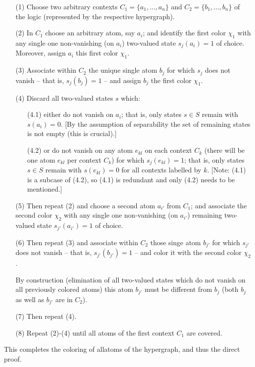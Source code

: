 \documentclass[%
  reprint,
  twocolumn,
 showpacs,
 showkeys,
 preprintnumbers,
 amsmath,amssymb,
 aps,
 pra,
  longbibliography,
 ]{revtex4-1}
\begin{document}
\begin{enumerate}
\item[(1)] Choose two arbitrary contexts
$C_1 =\{a_1,\ldots ,a_n\}$ and $C_2=\{b_1,\ldots ,b_n\}$ of the logic (represented by the respective hypergraph).

\item[(2)]
In $C_1$ choose an arbitrary atom, say $a_i$; and identify the first color $\chi_1$
with any single one non-vanishing (on $a_i$) two-valued state $s_j(a_i) =1$ of choice.
Moreover, assign $a_i$  this first color $\chi_1$.

\item[(3)] Associate within $C_2$ the unique single atom $b_j$ for which $s_j$ does not vanish
-- that is, $s_j(b_j)=1$ -- and assign $b_j$  the first color $\chi_1$.

\item[(4)] Discard all two-valued states $s$ which:

\begin{enumerate}
\item[(4.1)] either do not vanish on $a_i$; that is, only states $s \in S$ remain with $s(a_i)=0$.
[By the assumption of separability the set of remaining states is not empty (this is crucial).]

\item[(4.2)] or do not vanish on any atom $e_{kl}$ on each context $C_k$ (there will be one atom $e_{kl}$ per context $C_k$)
for which $s_j(e_{kl})=1$; that is, only states $s \in S$ remain with $s(e_{kl})=0$ for all contexts labelled by $k$.
[Note: (4.1) is a subcase of (4.2), so (4.1) is redundant and only (4.2) needs to be mentioned.]

\end{enumerate}
\item[(5)] Then repeat (2) and  choose a second atom $a_{i'}$ from $C_1$;
and associate the second color $\chi_2$ with any single one non-vanishing (on $a_{i'}$)
remaining two-valued state $s_{j'}(a_{i'}) =1$ of choice.

\item[(6)] Then repeat (3) and  associate within $C_2$ those singe atom $b_{j'}$
for which $s_{j'}$ does not vanish -- that is, $s_{j'}(b_{j'})=1$ -- and color it with the second color $\chi_2$.

By construction (elimination of all two-valued states which do not vanish on all previously colored atoms)
this atom $b_{j'}$ must be different from $b_j$ (both $b_j$ as well as $b_{j'}$ are in $C_2$).

\item[(7)] Then repeat (4).

\item[(8)] Repeat (2)-(4) until all atoms of the first context $C_1$ are covered.

\end{enumerate}
This completes the coloring of allatoms of the hypergraph, and thus the direct proof.
\end{document}
